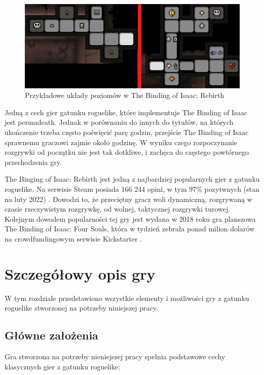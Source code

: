 \documentclass[12pt,twoside]{article}
\begin{document}
\FloatBarrier
\begin{figure}[h]
	\centering
	\includegraphics[width=12cm]{images/tboi/scr3.png}
	\caption{Przykładowe układy poziomów w The Binding of Isaac: Rebirth}
	\label{tboi:scr3}
\end{figure}
\FloatBarrier


Jedną z cech gier gatunku roguelike, które implementuje The Binding of Isaac jest permadeath. Jednak w porównaniu do innych do tytułów, na których ukończenie trzeba często poświęcić parę godzin, przejście The Binding of Isaac sprawnemu graczowi zajmie około godzinę. W wyniku czego rozpoczynanie rozgrywki od początku nie jest tak dotkliwe, i zachęca do częstego powtórnego przechodzenia gry.


The Binging of Isaac: Rebirth jest jedną z najbardziej popularnych gier z gatunku roguelike. Na serwisie Steam posiada 166 244 opini, w tym 97\% pozytwnych (stan na luty 2022) \cite{tboi_steam}. Dowodzi to, że przeciętny gracz woli dynamiczną, rozgrywaną w czasie rzeczywistym rozgrywkę, od wolnej, taktycznej rozgrywki turowej. Kolejnym dowodem popularności tej gry jest wydana w 2018 roku gra planszowa The Binding of Isaac: Four Souls, która w tydzień zebrała ponad milion dolarów na crowdfundingowym serwisie Kickstarter \cite{tboi_4souls}.



\clearpage	

\section{Szczegółowy opis gry}

W tym rozdziale przedstawiono wszystkie elementy i możliwości gry z gatunku roguelike stworzonej na potrzeby niniejszej pracy.


\subsection{Główne założenia}
Gra stworzona na potrzeby nieniejszej pracy spełnia podstawowe cechy klasycznych gier z gatunku roguelike:
\end{document}
